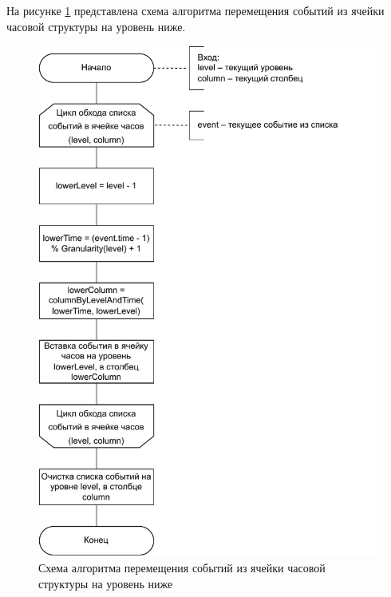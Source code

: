 \documentclass{bmstu}
\begin{document}
\clearpage
На рисунке \ref{img:hybrid_moveEvents_schema} представлена схема алгоритма перемещения событий из ячейки часовой структуры на уровень ниже.
\begin{figure}[h!btp]
	\centering
	\includegraphics[width=0.8\columnwidth]{inc/img/hybrid_moveEvents_schema.pdf}
	\caption{Схема алгоритма перемещения событий из ячейки часовой структуры на уровень ниже}
	\label{img:hybrid_moveEvents_schema}	
\end{figure}
\end{document}
